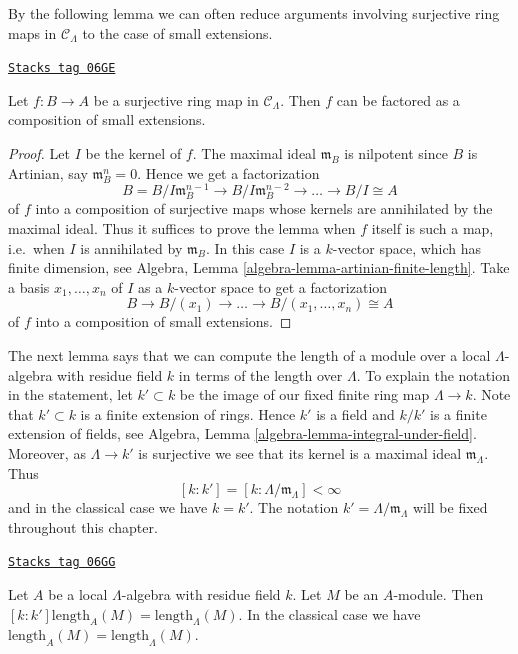 By the following lemma we can often reduce arguments involving surjective ring
maps in $\mathcal{C}_\Lambda$ to the case of small extensions.

\begin{lemma}
\label{formal-defos-lemma-factor-small-extension}
\href{https://stacks.math.columbia.edu/tag/06GE}{\texttt{Stacks tag 06GE}}

Let $f: B \to A$ be a surjective ring map in $\mathcal{C}_\Lambda$.
Then $f$ can be factored as a composition of small extensions.
\end{lemma}

\begin{proof}
Let $I$ be the kernel of $f$.  The maximal ideal $\mathfrak{m}_B$ is
nilpotent since $B$ is Artinian, say $\mathfrak{m}_B^n = 0$. Hence we get a
factorization
$$
B = B/I\mathfrak{m}_B^{n-1} \to B/I\mathfrak{m}_B^{n-2} \to
\ldots \to B/I \cong A
$$
of $f$ into a composition of surjective maps whose kernels are annihilated by
the maximal ideal.  Thus it suffices to prove the lemma when $f$ itself is such
a map, i.e.\ when $I$ is annihilated by $\mathfrak{m}_B$. In this case
$I$ is a $k$-vector space, which has finite dimension, see
Algebra, Lemma \ref{algebra-lemma-artinian-finite-length}.
Take a basis $x_1, \ldots, x_n$ of $I$ as a $k$-vector space to get a
factorization
$$
B \to B/(x_1) \to \ldots \to  B/(x_1, \ldots, x_n) \cong  A
$$
of $f$ into a composition of small extensions.
\end{proof}

The next lemma says that we can compute the length of a module over a local
$\Lambda$-algebra with residue field $k$ in terms of the length over
$\Lambda$. To explain the notation in the statement, let $k' \subset k$
be the image of our fixed finite ring map $\Lambda \to k$. Note
that $k' \subset k$ is a finite extension of rings. Hence $k'$ is a field
and $k/k'$ is a finite extension of fields, see
Algebra, Lemma \ref{algebra-lemma-integral-under-field}.
Moreover, as $\Lambda \to k'$ is surjective we see that its kernel
is a maximal ideal $\mathfrak m_\Lambda$. Thus
\begin{equation}
\label{equation-k-prime}
[k : k'] = [k : \Lambda/\mathfrak m_\Lambda] < \infty
\end{equation}
and in the classical case we have $k = k'$. The notation
$k' = \Lambda/\mathfrak m_\Lambda$ will be fixed throughout this chapter.

\begin{lemma}[Length]
\label{formal-defos-lemma-length}
\href{https://stacks.math.columbia.edu/tag/06GG}{\texttt{Stacks tag 06GG}}

Let $A$ be a local $\Lambda$-algebra with residue field $k$.
Let $M$ be an $A$-module. Then
$[k : k'] \text{length}_A(M) = \text{length}_\Lambda(M)$.
In the classical case we have
$\text{length}_A(M) = \text{length}_\Lambda(M)$.
\end{lemma}

